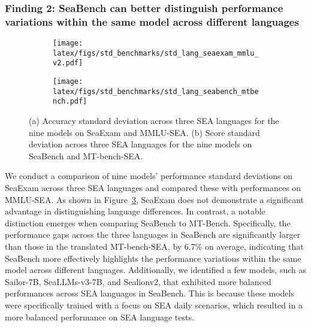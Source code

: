 % 

\subsubsection{Finding 2: SeaBench can better distinguish performance variations within the same model across different languages} \label{finding2}



\begin{figure}[htb]
    \centering
    \begin{subfigure}[b]{0.48\linewidth}
        \centering
        \texttt{[image: latex/figs/std\_benchmarks/std\_lang\_seaexam\_mmlu\_v2.pdf]}
        \caption{}
        \label{subfig:seaexam_example}
    \end{subfigure}
    \begin{subfigure}[b]{0.48\linewidth}
        \centering
        \texttt{[image: latex/figs/std\_benchmarks/std\_lang\_seabench\_mtbench.pdf]}
        \caption{}
        \label{subfig:seabench_example}
    \end{subfigure}
    \caption{(a) Accuracy standard deviation across three SEA languages for the nine models on SeaExam and MMLU-SEA. (b) Score standard deviation across three SEA languages for the nine models on SeaBench and MT-bench-SEA.}
    \label{fig:finding2}
\end{figure}


We conduct a comparison of nine models' performance standard deviations on SeaExam across three SEA languages and compared these with performances on MMLU-SEA. As shown in Figure~\ref{fig:finding2}, SeaExam does not demonstrate a significant advantage in distinguishing language differences. In contrast, a notable distinction emerges when comparing SeaBench to MT-Bench. Specifically, the performance gaps across the three languages in SeaBench are significantly larger than those in the translated MT-bench-SEA, by 6.7\% on average, indicating that SeaBench more effectively highlights the performance variations within the same model across different languages. Additionally, we identified a few models, such as Sailor-7B, SeaLLMs-v3-7B, and Sealionv2, that exhibited more balanced performances across SEA languages in SeaBench. This is because these models were specifically trained with a focus on SEA daily scenarios, which resulted in a more balanced performance on SEA language tests.



